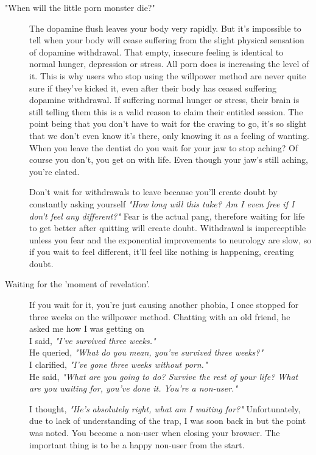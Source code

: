 \documentclass[easypeasy.tex]{subfiles}
\begin{document}
\begin{description}
\begin{description}
      \item["When will the little porn monster die?"]
        The dopamine flush leaves your body very rapidly. But it's impossible to tell when your body will cease suffering from the slight physical sensation of dopamine withdrawal. That empty, insecure feeling is identical to normal hunger, depression or stress. All porn does is increasing the level of it. This is why users who stop using the willpower method are never quite sure if they've kicked it, even after their body has ceased suffering dopamine withdrawal. If suffering normal hunger or stress, their brain is still telling them this is a valid reason to claim their entitled session. The point being that you don't have to wait for the craving to go, it's so slight that we don't even know it's there, only knowing it as a feeling of wanting. When you leave the dentist do you wait for your jaw to stop aching? Of course you don't, you get on with life. Even though your jaw's still aching, you're elated.

        Don't wait for withdrawals to leave because you'll create doubt by constantly asking yourself \textit{"How long will this take? Am I even free if I don't feel any different?"} Fear is the actual pang, therefore waiting for life to get better after quitting will create doubt. Withdrawal is imperceptible unless you fear and the exponential improvements to neurology are slow, so if you wait to feel different, it'll feel like nothing is happening, creating doubt.

      \item [Waiting for the 'moment of revelation'.] If you wait for it, you're just causing another phobia, I once stopped for three weeks on the willpower method. Chatting with an old friend, he asked me how I was getting on \\
        I said, \textit{"I've survived three weeks."} \\
        He queried, \textit{"What do you mean, you've survived three weeks?"} \\
        I clarified, \textit{"I've gone three weeks without porn."} \\
        He said, \textit{"What are you going to do? Survive the rest of your life? What are you waiting for, you've done it. You're a non-user."}

        I thought, \textit{"He's absolutely right, what am I waiting for?"} Unfortunately, due to lack of understanding of the trap, I was soon back in but the point was noted. You become a non-user when closing your browser. The important thing is to be a happy non-user from the start.


\end{description}
\end{description}
\end{document}
